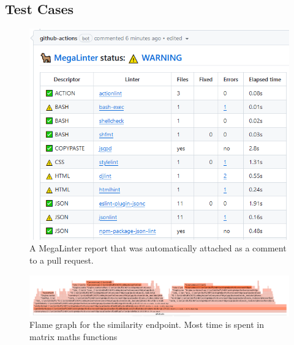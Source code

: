 \clearpage\subsection{Test Cases}

\begin{figure}[ht]
  \centering
  \caption{\label{fig:metalinter_report}A MegaLinter report that was automatically attached as a comment to a pull request.}
  \includegraphics[width=\textwidth]{figures/megalinter_report.png}
\end{figure}

\begin{figure}
  \centering
  \caption{\label{fig:similarity_flamegraph}Flame graph for the similarity endpoint. Most time is spent in matrix maths functions}
  \includegraphics[angle=90,height=0.9\textheight]{figures/similarity_flamegraph.png}
\end{figure}

